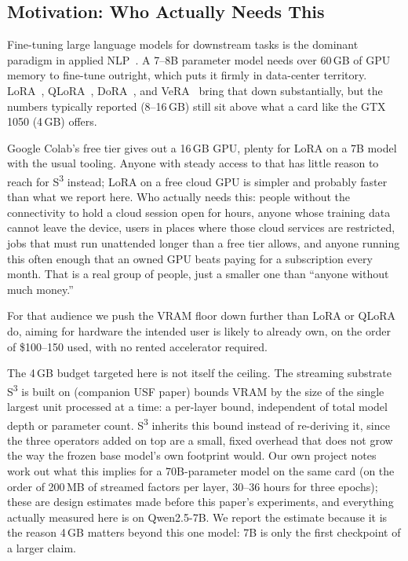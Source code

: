\documentclass[conference]{IEEEtran}
\newcommand{\sthree}{S\textsuperscript{3}}
\begin{document}
\subsection{Motivation: Who Actually Needs This}
\label{sec:motivation}

Fine-tuning large language models for downstream tasks is the dominant paradigm in applied NLP~\cite{hu2021lora,dettmers2023qlora}. A 7--8B parameter model needs over 60\,GB of GPU memory to fine-tune outright, which puts it firmly in data-center territory. LoRA~\cite{hu2021lora}, QLoRA~\cite{dettmers2023qlora}, DoRA~\cite{liu2024dora}, and VeRA~\cite{kopiczko2024vera} bring that down substantially, but the numbers typically reported (8--16\,GB) still sit above what a card like the GTX 1050 (4\,GB) offers.

Google Colab's free tier gives out a 16\,GB GPU, plenty for LoRA on a 7B model with the usual tooling. Anyone with steady access to that has little reason to reach for \sthree{} instead; LoRA on a free cloud GPU is simpler and probably faster than what we report here. Who actually needs this: people without the connectivity to hold a cloud session open for hours, anyone whose training data cannot leave the device, users in places where those cloud services are restricted, jobs that must run unattended longer than a free tier allows, and anyone running this often enough that an owned GPU beats paying for a subscription every month. That is a real group of people, just a smaller one than ``anyone without much money.''

For that audience we push the VRAM floor down further than LoRA or QLoRA do, aiming for hardware the intended user is likely to already own, on the order of \$100--150 used, with no rented accelerator required.

The 4\,GB budget targeted here is not itself the ceiling. The streaming substrate \sthree{} is built on (companion USF paper) bounds VRAM by the size of the single largest unit processed at a time: a per-layer bound, independent of total model depth or parameter count. \sthree{} inherits this bound instead of re-deriving it, since the three operators added on top are a small, fixed overhead that does not grow the way the frozen base model's own footprint would. Our own project notes work out what this implies for a 70B-parameter model on the same card (on the order of 200\,MB of streamed factors per layer, 30--36 hours for three epochs); these are design estimates made before this paper's experiments, and everything actually measured here is on Qwen2.5-7B. We report the estimate because it is the reason 4\,GB matters beyond this one model: 7B is only the first checkpoint of a larger claim.
\end{document}
